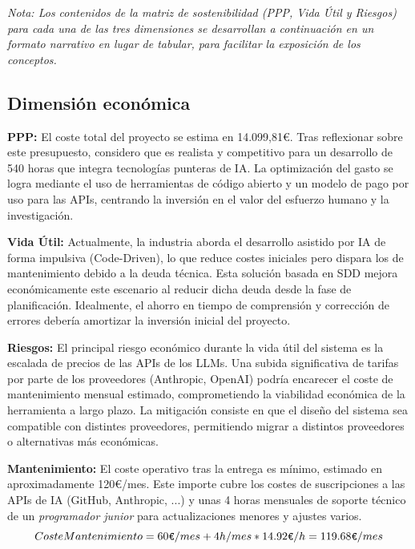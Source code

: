 \documentclass[11pt, letterpaper]{article}
\begin{document}
\textit{Nota: Los contenidos de la matriz de sostenibilidad (PPP, Vida Útil y Riesgos) para cada una de las tres dimensiones se desarrollan a continuación en un formato narrativo en lugar de tabular, para facilitar la exposición de los conceptos.}

\subsection{Dimensión económica}
\textbf{PPP:} El coste total del proyecto se estima en 14.099,81€. Tras reflexionar sobre este presupuesto, considero que es realista y competitivo para un desarrollo de 540 horas que integra tecnologías punteras de IA. La optimización del gasto se logra mediante el uso de herramientas de código abierto y un modelo de pago por uso para las APIs, centrando la inversión en el valor del esfuerzo humano y la investigación.

\textbf{Vida Útil:} Actualmente, la industria aborda el desarrollo asistido por IA de forma impulsiva (Code-Driven), lo que reduce costes iniciales pero dispara los de mantenimiento debido a la deuda técnica. Esta solución basada en SDD mejora económicamente este escenario al reducir dicha deuda desde la fase de planificación. Idealmente, el ahorro en tiempo de comprensión y corrección de errores debería amortizar la inversión inicial del proyecto.

\textbf{Riesgos:} El principal riesgo económico durante la vida útil del sistema es la escalada de precios de las APIs de los LLMs. Una subida significativa de tarifas por parte de los proveedores (Anthropic, OpenAI) podría encarecer el coste de mantenimiento mensual estimado, comprometiendo la viabilidad económica de la herramienta a largo plazo. La mitigación consiste en que el diseño del sistema sea compatible con distintes proveedores, permitiendo migrar a distintos proveedores o alternativas más económicas.

\textbf{Mantenimiento:} El coste operativo tras la entrega es mínimo, estimado en aproximadamente 120€/mes. Este importe cubre los costes de suscripciones a las APIs de IA (GitHub, Anthropic, ...) y unas 4 horas mensuales de soporte técnico de un \textit{programador junior} para actualizaciones menores y ajustes varios.
\begin{equation}
    CosteMantenimiento = 60\verb|€|/mes + 4h/mes * 14{.}92\verb|€|/h = 119{.}68\verb|€|/mes
\end{equation}
\end{document}
